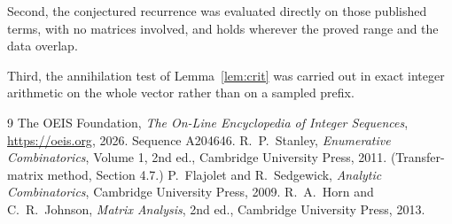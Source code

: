 \documentclass[11pt,a4paper]{article}
\theoremstyle{plain}
\theoremstyle{definition}
\begin{document}
Second, the conjectured recurrence was evaluated directly on those published terms, with no
matrices involved, and holds wherever the proved range and the data overlap.

Third, the annihilation test of Lemma~\ref{lem:crit} was carried out in exact integer
arithmetic on the whole vector rather than on a sampled prefix.

\begin{thebibliography}{9}
 The OEIS Foundation, \emph{The On-Line Encyclopedia of Integer
Sequences}, \url{https://oeis.org}, 2026. Sequence A204646.
 R.~P.~Stanley, \emph{Enumerative Combinatorics}, Volume 1, 2nd ed.,
Cambridge University Press, 2011. (Transfer-matrix method, Section 4.7.)
 P.~Flajolet and R.~Sedgewick, \emph{Analytic Combinatorics}, Cambridge
University Press, 2009.
 R.~A.~Horn and C.~R.~Johnson, \emph{Matrix Analysis}, 2nd ed., Cambridge
University Press, 2013.
\end{thebibliography}
\end{document}
